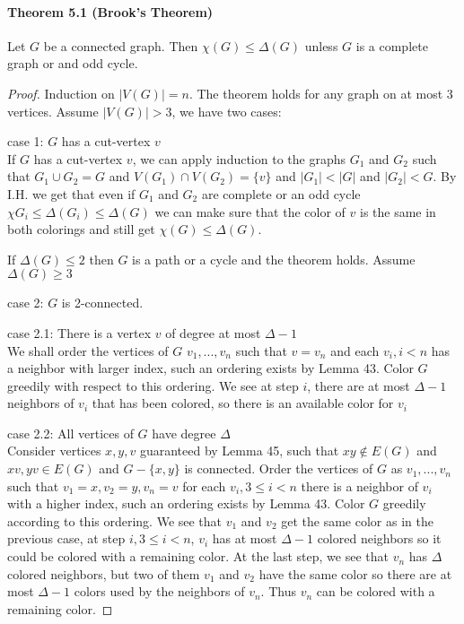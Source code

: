 \paragraph{Theorem 5.1 (Brook's Theorem)} Let $ G $ be a connected graph.
Then $ \chi(G) \leq \Delta(G) $ unless $G$ is a complete graph or and odd cycle.
\begin{proof}
Induction on $|V(G)| = n$. The theorem holds for any graph on at most 3
vertices. Assume $|V(G)| > 3$, we have two cases:

\bigskip \noindent
case 1: $G$ has a cut-vertex $v$ \\
If $G$ has a cut-vertex $v$, we can apply induction to the graphs $G_1$ and 
$G_2$ such that $G_1 \cup G_2 = G$ and $V(G_1) \cap V(G_2) = \{v\}$ and 
$|G_1| < |G|$ and $|G_2| < G$. By I.H. we get that even if $G_1$ and 
$G_2$ are complete or an odd cycle $\chi{G_i} \leq \Delta(G_i) \leq 
\Delta(G)$ we can make sure that the color of $v$ is the same in both 
colorings and still get $\chi(G) \leq \Delta(G)$.

\smallskip \noindent
If $\Delta(G) \leq 2$ then $G$ is a path or a cycle and the theorem holds.
Assume $\Delta(G) \geq 3$

\bigskip \noindent
case 2: $G$ is 2-connected.

\smallskip \noindent
case 2.1: There is a vertex $v$ of degree at most $\Delta -1$ \\
We shall order the vertices of $G$ $v_1,...,v_n$ such that $v = v_n$ and 
each $v_i, i<n$ has a neighbor with larger index, such an ordering exists 
by Lemma 43. Color $G$ greedily with respect to this ordering. We see at 
step $i$, there are at most $\Delta -1$ neighbors of $v_i$ that has been 
colored, so there is an available color for $v_i$

\smallskip \noindent
case 2.2: All vertices of $G$ have degree $\Delta$ \\
Consider vertices $x,y,v$ guaranteed by Lemma 45, such that $xy \notin E(G)$ 
and $xv,yv \in E(G)$ and $G-\{x,y\}$ is connected. Order the vertices 
of $G$ as $v_1,...,v_n$ such that $v_1 = x, v_2 = y, v_n = v$ for each 
$v_i, 3 \leq i < n$ there is a neighbor of $v_i$ with a higher index, such 
an ordering exists by Lemma 43. Color $G$ greedily according to this ordering. 
We see that $v_1$ and $v_2$ get the same color as in the previous case, at 
step $i, 3 \leq i < n$, $v_i$ has at most $\Delta -1$ colored neighbors so it 
could be colored with a remaining color. At the last step, we see that $v_n$
has $\Delta$ colored neighbors, but two of them $v_1$ and $v_2$ have the same 
color so there are at most $\Delta -1$ colors used by the neighbors of $v_n$.
Thus $v_n$ can be colored with a remaining color.
\end{proof}

